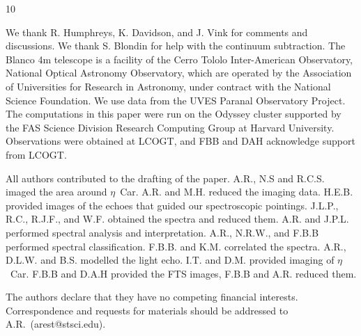 \documentclass{natureastroph}
\makeatletter
\def\reff@jnl#1{{\rm#1\/}}
\def\apj{\reff@jnl{Astrophys. J.}}
\makeatother
\begin{document}
\begin{thebibliography}{10}



\end{thebibliography}
   

  \fi
\fi


\begin{addendum}

\item We thank R. Humphreys, K. Davidson, and J. Vink for comments and
discussions. We thank S. Blondin for help with the continuum
subtraction. 
The Blanco 4m telescope is a facility of the Cerro Tololo
Inter-American Observatory, National Optical Astronomy Observatory,
which are operated by the Association of Universities for Research in
Astronomy, under contract with the National Science Foundation.
We use data from the UVES Paranal Observatory Project.
The computations in this paper were run on the Odyssey cluster
supported by the FAS Science Division Research Computing Group at
Harvard University.  Observations were obtained at LCOGT, and FBB and
DAH acknowledge support from LCOGT.


\item[Author Contributions] All authors contributed to the drafting of
the paper.  A.R., N.S and R.C.S. imaged the area around $\eta$~Car.
A.R. and M.H. reduced the imaging data. H.E.B. provided images of the
echoes that guided our spectroscopic pointings.  J.L.P., R.C., R.J.F.,
and W.F. obtained the spectra and reduced them. A.R. and
J.P.L. performed spectral analysis and interpretation. A.R., N.R.W.,
and F.B.B performed spectral classification. F.B.B. and
K.M. correlated the spectra.  A.R., D.L.W. and B.S. modelled the light
echo. I.T. and D.M. provided imaging of $\eta$~Car. F.B.B and D.A.H
provided the FTS images, F.B.B and A.R. reduced them.


 \item[Author Information]  The authors declare that they have no
competing financial interests. Correspondence and requests for materials
should be addressed to A.R.~(arest@stsci.edu).

\end{addendum}

\ifastroph
    
  
  \clearpage
  
\else
  \ifsuppl
    \pagestyle{empty}
      
    \clearpage
    
    \clearpage
    
    \clearpage
  \else
      
  \fi
\fi
\end{document}
